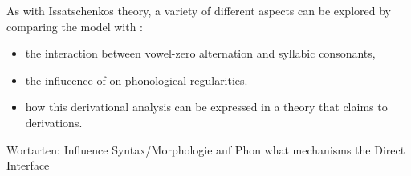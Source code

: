 As with Issatschenkos theory, a variety of different aspects
can be explored by comparing the \CVCV model with
\cite{hohleVater1978}:
\begin{itemize}
  \item the interaction between vowel-zero alternation and syllabic consonants,
  \item the influcence of  on phonological regularities.
  \item how this derivational analysis can be expressed in a theory
    that claims to  derivations.\footnotemark
\end{itemize}

Wortarten: Influence Syntax/Morphologie auf Phon
  \to what mechanisms  the Direct Interface \cite{scheer2012}